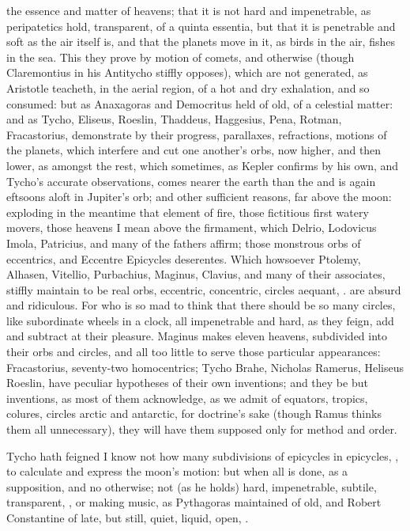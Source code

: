 {the essence and matter of heavens; that it is not hard and
impenetrable, as peripatetics hold, transparent, of a quinta essentia,
but that it is penetrable and soft as the air itself is, and that
the planets move in it, as birds in the air, fishes in the sea. This
they prove by motion of comets, and otherwise (though Claremontius in
his Antitycho stiffly opposes), which are not generated, as Aristotle
teacheth, in the aerial region, of a hot and dry exhalation, and so
consumed: but as Anaxagoras and Democritus held of old, of a celestial
matter: and as  Tycho, Eliseus, Roeslin, Thaddeus,
Haggesius, Pena, Rotman, Fracastorius, demonstrate by their progress,
parallaxes, refractions, motions of the planets, which interfere and
cut one another's orbs, now higher, and then lower, as  amongst the
rest, which sometimes, as Kepler confirms by his own, and Tycho's
accurate observations, comes nearer the earth than the  and is again
eftsoons aloft in Jupiter's orb; and other sufficient reasons,
far above the moon: exploding in the meantime that element of fire,
those fictitious first watery movers, those heavens I mean above the
firmament, which Delrio, Lodovicus Imola, Patricius, and many of the
fathers affirm; those monstrous orbs of eccentrics, and Eccentre
Epicycles deserentes. Which howsoever Ptolemy, Alhasen, Vitellio,
Purbachius, Maginus, Clavius, and many of their associates, stiffly
maintain to be real orbs, eccentric, concentric, circles aequant, \etc{}.
are absurd and ridiculous. For who is so mad to think that there should
be so many circles, like subordinate wheels in a clock, all
impenetrable and hard, as they feign, add and subtract at their
pleasure. Maginus makes eleven heavens, subdivided into their
orbs and circles, and all too little to serve those particular
appearances: Fracastorius, seventy-two homocentrics; Tycho Brahe,
Nicholas Ramerus, Heliseus Roeslin, have peculiar hypotheses of their
own inventions; and they be but inventions, as most of them
acknowledge, as we admit of equators, tropics, colures, circles arctic
and antarctic, for doctrine's sake (though Ramus thinks them all
unnecessary), they will have them supposed only for method and order.

Tycho hath feigned I know not how many subdivisions of epicycles in
epicycles, \etc{}, to calculate and express the moon's motion: but when
all is done, as a supposition, and no otherwise; not (as he holds)
hard, impenetrable, subtile, transparent, \etc{}, or making music, as
Pythagoras maintained of old, and Robert Constantine of late, but
still, quiet, liquid, open, \etc{}.

}

